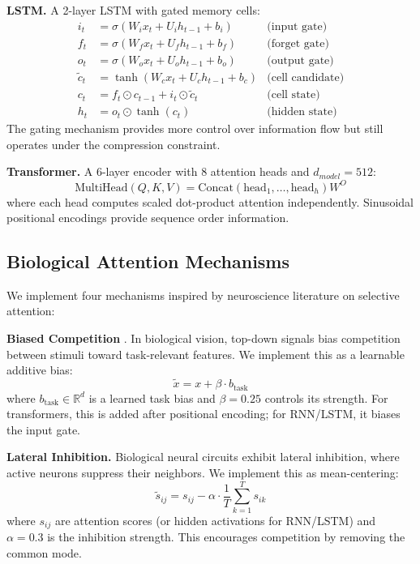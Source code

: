 \textbf{LSTM.} A 2-layer LSTM with gated memory cells:
\begin{align}
i_t &= \sigma(W_i x_t + U_i h_{t-1} + b_i) & \text{(input gate)} \\
f_t &= \sigma(W_f x_t + U_f h_{t-1} + b_f) & \text{(forget gate)} \\
o_t &= \sigma(W_o x_t + U_o h_{t-1} + b_o) & \text{(output gate)} \\
\tilde{c}_t &= \tanh(W_c x_t + U_c h_{t-1} + b_c) & \text{(cell candidate)} \\
c_t &= f_t \odot c_{t-1} + i_t \odot \tilde{c}_t & \text{(cell state)} \\
h_t &= o_t \odot \tanh(c_t) & \text{(hidden state)}
\end{align}
The gating mechanism provides more control over information flow but still operates under the compression constraint.

\textbf{Transformer.} A 6-layer encoder with 8 attention heads and $d_{model}=512$:
\begin{equation}
\text{MultiHead}(Q, K, V) = \text{Concat}(\text{head}_1, \ldots, \text{head}_h)W^O
\end{equation}
where each head computes scaled dot-product attention independently. Sinusoidal positional encodings provide sequence order information.

\subsection{Biological Attention Mechanisms}

We implement four mechanisms inspired by neuroscience literature on selective attention:

\textbf{Biased Competition} \cite{desimone1995neural}. In biological vision, top-down signals bias competition between stimuli toward task-relevant features. We implement this as a learnable additive bias:
\begin{equation}
\tilde{x} = x + \beta \cdot b_{\text{task}}
\end{equation}
where $b_{\text{task}} \in \mathbb{R}^d$ is a learned task bias and $\beta=0.25$ controls its strength. For transformers, this is added after positional encoding; for RNN/LSTM, it biases the input gate.

\textbf{Lateral Inhibition.} Biological neural circuits exhibit lateral inhibition, where active neurons suppress their neighbors. We implement this as mean-centering:
\begin{equation}
\tilde{s}_{ij} = s_{ij} - \alpha \cdot \frac{1}{T} \sum_{k=1}^{T} s_{ik}
\end{equation}
where $s_{ij}$ are attention scores (or hidden activations for RNN/LSTM) and $\alpha=0.3$ is the inhibition strength. This encourages competition by removing the common mode.

